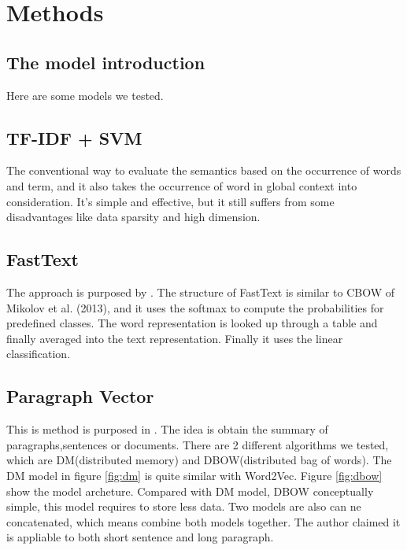 \chapter{Methods}

\section{The model introduction}

Here are some models we tested.

\section{TF-IDF + SVM}

	The conventional way to evaluate the semantics based on the occurrence of words and term, and it also takes the occurrence of word in global context into consideration.  It's simple and effective, but it still suffers from some disadvantages like data sparsity and high dimension. \\
	
\section{FastText}
	
	The approach is purposed by \cite{joulin2016fasttext}. The structure of FastText is similar to CBOW of Mikolov et al. (2013), and it uses the softmax to compute the probabilities for predefined classes. The word representation is looked up through a table and finally averaged into the text representation. Finally it uses the linear classification.

\section{Paragraph Vector}
	
This is method is purposed in \cite{PVDB}. The idea is obtain the summary of paragraphs,sentences or documents. 
There are 2 different algorithms we tested, which are DM(distributed memory) and DBOW(distributed bag of words). 
The DM model in figure \ref{fig:dm} is quite similar with Word2Vec.
Figure \ref{fig:dbow} show the model archeture. Compared with DM model, DBOW conceptually simple, this model requires to store less data. 
Two models are also can ne concatenated, which means combine both models together. The author claimed it is appliable to  both short sentence and long paragraph.\\

